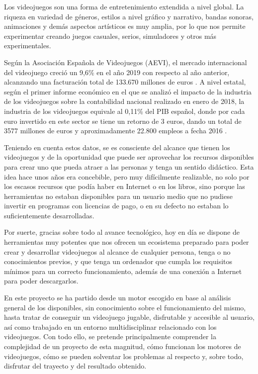 Los videojuegos son una forma de entretenimiento extendida a nivel global. La riqueza en variedad de géneros, estilos a nivel gráfico y narrativo, bandas sonoras, animaciones y demás aspectos artísticos es muy amplia, por lo que nos permite experimentar creando juegos casuales, serios, simuladores y otros más experimentales.

Según la Asociación Española de Videojuegos (AEVI), el mercado internacional del videojuego creció un 9,6\% en el año 2019 con respecto al año anterior, alcanzando una facturación total de 133.670 millones de euros \cite{aevi:internacional}. A nivel estatal, según el primer informe económico en el que se analizó el impacto de la industria de los videojuegos sobre la contabilidad nacional realizado en enero de 2018, la industria de los videojuegos equivale al 0,11\% del PIB español, donde por cada euro invertido en este sector se tiene un retorno de 3 euros, dando un total de 3577 millones de euros y aproximadamente 22.800 empleos a fecha 2016 \cite{aevi:nacional}. 

Teniendo en cuenta estos datos, se es consciente del alcance que tienen los videojuegos y de la oportunidad que puede ser aprovechar los recursos disponibles para crear uno que pueda atraer a las personas y tenga un sentido didáctico. Esta idea hace unos años era concebible, pero muy difícilmente realizable, no solo por los escasos recursos que podía haber en Internet o en los libros, sino porque las herramientas no estaban disponibles para un usuario medio que no pudiese invertir en programas con licencias de pago, o en su defecto no estaban lo suficientemente desarrolladas.

Por suerte, gracias sobre todo al avance tecnológico, hoy en día se dispone de herramientas muy potentes que nos ofrecen un ecosistema preparado para poder crear y desarrollar videojuegos al alcance de cualquier persona, tenga o no conocimientos previos, y que tenga un ordenador que cumpla los requisitos mínimos para un correcto funcionamiento, además de una conexión a Internet para poder descargarlos.

En este proyecto se ha partido desde un motor escogido en base al análisis general de los disponibles, sin conocimiento sobre el funcionamiento del mismo, hasta tratar de conseguir un videojuego jugable, disfrutable y accesible al usuario, así como trabajado en un entorno multidisciplinar relacionado con los videojuegos. Con todo ello, se pretende principalmente comprender la complejidad de un proyecto de esta magnitud, cómo funcionan los motores de videojuegos, cómo se pueden solventar los problemas al respecto y, sobre todo, disfrutar del trayecto y del resultado obtenido.

